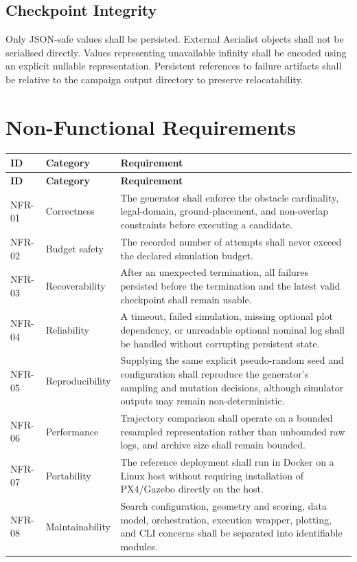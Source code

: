 \documentclass[11pt,a4paper,openany]{report}
\begin{document}
\subsection{Checkpoint Integrity}
Only JSON-safe values shall be persisted. External Aerialist objects shall not be serialised directly. Values representing unavailable infinity shall be encoded using an explicit nullable representation. Persistent references to failure artifacts shall be relative to the campaign output directory to preserve relocatability.

\section{Non-Functional Requirements}
\begin{longtable}{L{1.7cm} L{3.0cm} L{9.9cm}}
\toprule
\textbf{ID} & \textbf{Category} & \textbf{Requirement}\\
\midrule
\endfirsthead
\toprule
\textbf{ID} & \textbf{Category} & \textbf{Requirement}\\
\midrule
\endhead
NFR-01 & Correctness & The generator shall enforce the obstacle cardinality, legal-domain, ground-placement, and non-overlap constraints before executing a candidate.\\
NFR-02 & Budget safety & The recorded number of attempts shall never exceed the declared simulation budget.\\
NFR-03 & Recoverability & After an unexpected termination, all failures persisted before the termination and the latest valid checkpoint shall remain usable.\\
NFR-04 & Reliability & A timeout, failed simulation, missing optional plot dependency, or unreadable optional nominal log shall be handled without corrupting persistent state.\\
NFR-05 & Reproducibility & Supplying the same explicit pseudo-random seed and configuration shall reproduce the generator's sampling and mutation decisions, although simulator outputs may remain non-deterministic.\\
NFR-06 & Performance & Trajectory comparison shall operate on a bounded resampled representation rather than unbounded raw logs, and archive size shall remain bounded.\\
NFR-07 & Portability & The reference deployment shall run in Docker on a Linux host without requiring installation of PX4/Gazebo directly on the host.\\
NFR-08 & Maintainability & Search configuration, geometry and scoring, data model, orchestration, execution wrapper, plotting, and CLI concerns shall be separated into identifiable modules.\\

\end{longtable}
\end{document}
